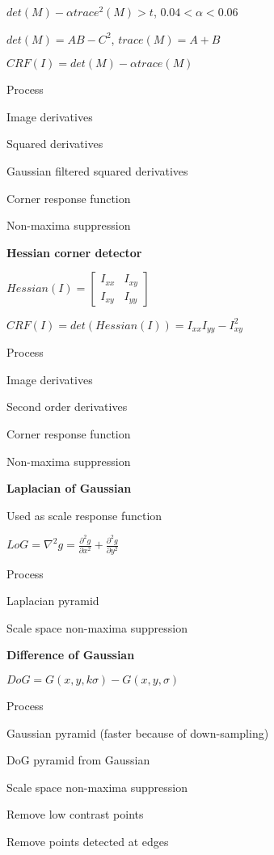 \documentclass{article}
\begin{document}
\begin{multicols*}{2}
{$det(M) - \alpha trace^2(M) > t$, $0.04 < \alpha < 0.06$

$det(M) = AB - C^2$, $trace(M) = A + B$

$CRF(I) = det(M) - \alpha trace(M)$

Process

\begin{compactenum}
	\item Image derivatives
	\item Squared derivatives
	\item Gaussian filtered squared derivatives
	\item Corner response function
	\item Non-maxima suppression
\end{compactenum}

\textbf{Hessian corner detector}

$Hessian(I) = \left[\begin{array}{cc}
	I_{xx} & I_{xy} \\
	I_{xy} & I_{yy}
\end{array}\right]$

$CRF(I) = det(Hessian(I)) = I_{xx}I_{yy} - I^2_{xy}$

Process

\begin{compactenum}
	\item Image derivatives
	\item Second order derivatives
	\item Corner response function
	\item Non-maxima suppression
\end{compactenum}

\textbf{Laplacian of Gaussian}

Used as scale response function

$LoG = \nabla^2g = \frac{\partial^2g}{\partial x^2} + \frac{\partial^2g}{\partial y^2}$

Process

\begin{compactenum}
	\item Laplacian pyramid
	\item Scale space non-maxima suppression
\end{compactenum}
\textbf{Difference of Gaussian}

$DoG = G(x, y, k \sigma) - G(x, y, \sigma)$

Process

\begin{compactenum}
	\item Gaussian pyramid (faster because of down-sampling)
	\item DoG pyramid from Gaussian
	\item Scale space non-maxima suppression
	\item Remove low contrast points
	\item Remove points detected at edges
\end{compactenum}

}
\end{multicols*}
\end{document}
